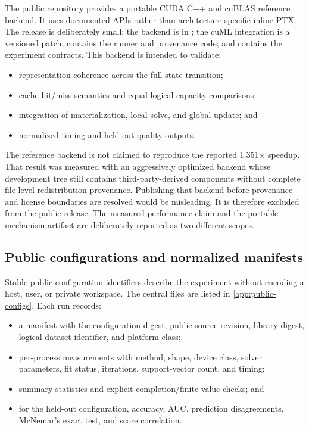 The public repository provides a portable CUDA C++ and cuBLAS reference
backend. It uses documented APIs rather than architecture-specific inline
PTX. The release is deliberately small: the backend is in
; the cuML integration is a versioned
patch;  contains the runner and provenance code; and
 contains the experiment contracts. This backend is
intended to validate:

\begin{itemize}
  \item representation coherence across the full state transition;
  \item cache hit/miss semantics and equal-logical-capacity comparisons;
  \item integration of materialization, local solve, and global update; and
  \item normalized timing and held-out-quality outputs.
\end{itemize}

The reference backend is not claimed to reproduce the reported
1.351$\times$ speedup. That result was measured with an aggressively optimized
 backend whose development tree still contains
third-party-derived components without complete file-level redistribution
provenance. Publishing that backend before provenance and license boundaries
are resolved would be misleading. It is therefore excluded from the public
release. The measured performance claim and the portable mechanism artifact
are deliberately reported as two different scopes.

\subsection{Public configurations and normalized manifests}

Stable public configuration identifiers describe the experiment without
encoding a host, user, or private workspace. The central files are listed in
\cref{app:public-configs}. Each run records:

\begin{itemize}
  \item a manifest with the configuration digest, public source revision,
        library digest, logical dataset identifier, and platform class;
  \item per-process measurements with method, shape, device class, solver
        parameters, fit status, iterations, support-vector count, and timing;
  \item summary statistics and explicit completion/finite-value checks; and
  \item for the held-out configuration, accuracy, AUC, prediction
        disagreements, McNemar's exact test, and score correlation.
\end{itemize}

